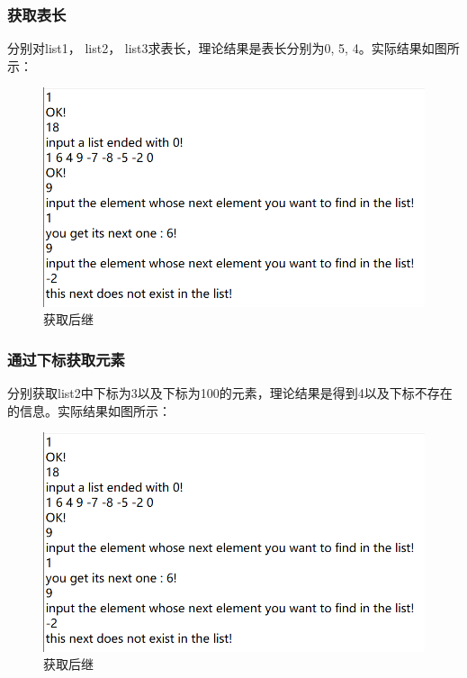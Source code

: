 \documentclass[supercite]{Experimental_Report}
\theoremstyle{definition}
\begin{document}
\subsubsection{获取表长}
分别对list1， list2， list3求表长，理论结果是表长分别为0, 5, 4。实际结果如图所示：
\begin{figure}[htbp]
	\centering
	\includegraphics[scale = 0.7]{images/8.png}
	\caption{获取后继}
\end{figure}
\subsubsection{通过下标获取元素}
分别获取list2中下标为3以及下标为100的元素，理论结果是得到4以及下标不存在的信息。实际结果如图所示：
\begin{figure}[htbp]
	\centering
	\includegraphics[scale = 0.7]{images/8.png}
	\caption{获取后继}
\end{figure}
\end{document}
